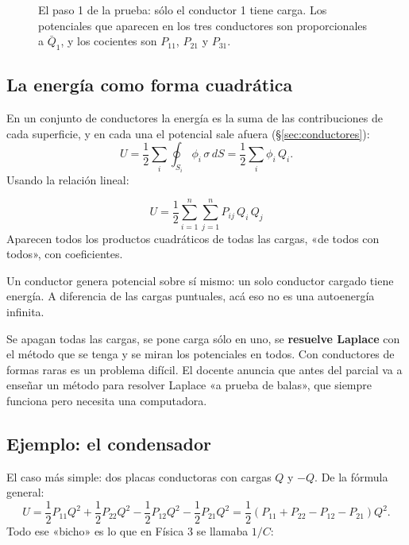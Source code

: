 \documentclass[12pt,a4paper]{article}
\begin{document}
\begin{figure}[H]
  \centering
  
  \caption{El paso 1 de la prueba: sólo el conductor 1 tiene carga. Los
  potenciales que aparecen en los tres conductores son proporcionales a
  $\bar Q_1$, y los cocientes son $P_{11}$, $P_{21}$ y $P_{31}$.}
\end{figure}

\subsection{La energía como forma cuadrática}

En un conjunto de conductores la energía es la suma de las contribuciones de cada
superficie, y en cada una el potencial sale afuera
(§\ref{sec:conductores}):
\[
U = \frac12\sum_i\oint_{S_i}\phi_i\,\sigma\,dS = \frac12\sum_i\phi_i\,Q_i .
\]
Usando la relación lineal:

\begin{keybox}
\[
\boxed{\ U = \frac12\sum_{i=1}^{n}\sum_{j=1}^{n}P_{ij}\,Q_i\,Q_j\ }
\]
Aparecen todos los productos cuadráticos de todas las cargas, «de todos con
todos», con coeficientes.
\end{keybox}

\begin{notebox}[Sí aparece $i=j$]
Un conductor genera potencial sobre sí mismo: un solo conductor cargado tiene
energía. A diferencia de las cargas puntuales, acá eso no es una autoenergía
infinita.
\end{notebox}

\begin{notebox}
Se apagan todas las cargas, se pone carga sólo en uno, se \textbf{resuelve
Laplace} con el método que se tenga y se miran los potenciales en todos. Con
conductores de formas raras es un problema difícil. El docente anuncia que antes
del parcial va a enseñar un método para resolver Laplace «a prueba de balas», que
siempre funciona pero necesita una computadora.
\end{notebox}

\subsection{Ejemplo: el condensador}

El caso más simple: dos placas conductoras con cargas $Q$ y $-Q$. De la fórmula
general:
\[
U = \frac12 P_{11}Q^2 + \frac12 P_{22}Q^2 - \frac12 P_{12}Q^2 - \frac12 P_{21}Q^2
= \frac12\left(P_{11}+P_{22}-P_{12}-P_{21}\right)Q^2 .
\]
Todo ese «bicho» es lo que en Física 3 se llamaba $1/C$:
\end{document}
